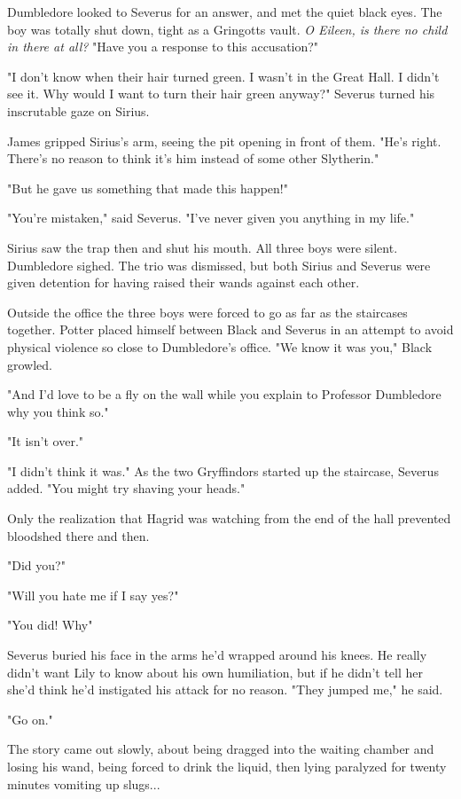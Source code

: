 Dumbledore looked to Severus for an answer, and met the quiet black eyes. The boy was totally shut down, tight as a Gringotts vault. \emph{O Eileen, is there no child in there at all?} "Have you a response to this accusation?"

"I don't know when their hair turned green. I wasn't in the Great Hall. I didn't see it. Why would I want to turn their hair green anyway?" Severus turned his inscrutable gaze on Sirius.

James gripped Sirius's arm, seeing the pit opening in front of them. "He's right. There's no reason to think it's him instead of some other Slytherin."

"But he gave us something that made this happen!"

"You're mistaken," said Severus. "I've never given you anything in my life."

Sirius saw the trap then and shut his mouth. All three boys were silent. Dumbledore sighed. The trio was dismissed, but both Sirius and Severus were given detention for having raised their wands against each other.

Outside the office the three boys were forced to go as far as the staircases together. Potter placed himself between Black and Severus in an attempt to avoid physical violence so close to Dumbledore's office. "We know it was you," Black growled.

"And I'd love to be a fly on the wall while you explain to Professor Dumbledore why you think so."

"It isn't over."

"I didn't think it was." As the two Gryffindors started up the staircase, Severus added. "You might try shaving your heads."

Only the realization that Hagrid was watching from the end of the hall prevented bloodshed there and then.

"Did you?"

"Will you hate me if I say yes?"

"You did! Why"

Severus buried his face in the arms he'd wrapped around his knees. He really didn't want Lily to know about his own humiliation, but if he didn't tell her she'd think he'd instigated his attack for no reason. "They jumped me," he said.

"Go on."

The story came out slowly, about being dragged into the waiting chamber and losing his wand, being forced to drink the liquid, then lying paralyzed for twenty minutes vomiting up slugs...

